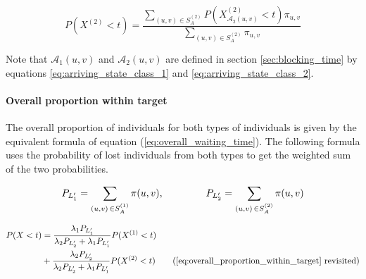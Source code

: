 \begin{equation}
    P(X^{(2)} < t) = \frac{\sum_{(u,v) \in S_A^{(2)}} 
    P(X_{\mathcal{A}_2(u,v)}^{(2)} < t) 
    \pi_{u,v} }{\sum_{(u,v) \in S_A^{(2)}} \pi_{u,v}}
\end{equation}

Note that \(\mathcal{A}_1(u,v)\) and \(\mathcal{A}_2(u,v)\) are defined in 
section \ref{sec:blocking_time} by equations \ref{eq:arriving_state_class_1} 
and \ref{eq:arriving_state_class_2}.

\paragraph{Overall proportion within target}

The overall proportion of individuals for both types of individuals is given by 
the equivalent formula of equation (\ref{eq:overall_waiting_time}).
The following formula uses the probability of lost individuals from both types
to get the weighted sum of the two probabilities.

\begin{equation*}
    P_{L'_1} = \sum_{(u,v) \, \in S_A^{(1)}} \pi(u,v), \hspace{1.5cm}
    P_{L'_2} = \sum_{(u,v) \, \in S_A^{(2)}} \pi(u,v)
\end{equation*}

\begin{align}
    P(X < t) &= \frac{\lambda_1 P_{L'_1}}{\lambda_2 P_{L'_2}+\lambda_1 P_{L'_1}} 
    P(X^{(1)} < t) \nonumber \\
    &+ \frac{\lambda_2 P_{L'_2}}{\lambda_2 P_{L'_2} + \lambda_1 
    P_{L'_1}} P(X^{(2)} < t) 
    \tag{\ref{eq:overall_proportion_within_target} revisited}
\end{align}
